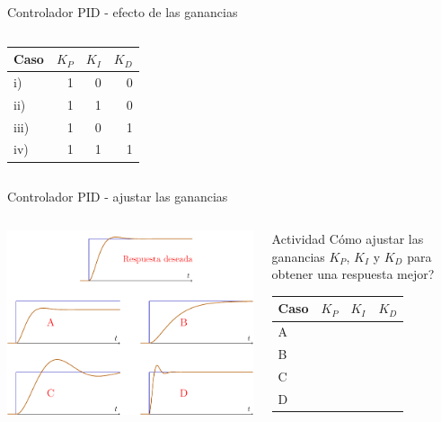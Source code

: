 \documentclass[presentation,aspectratio=169, usenames, dvipsnames]{beamer}
\begin{document}
\begin{frame}[label={sec:orgfd823fc}]{Controlador PID - efecto de las ganancias}
\begin{columns}
\begin{column}{0.3\columnwidth}
\begin{center}
\begin{tabular}{lrrr}
Caso & \textcolor{ppc}{\(K_P\)} & \textcolor{iic}{\(K_I\)} & \textcolor{ddc}{\(K_D\)}\\
\hline
i) & 1 & 0 & 0\\
ii) & 1 & 1 & 0\\
iii) & 1 & 0 & 1\\
iv) & 1 & 1 & 1\\
\end{tabular}
\end{center}
\end{column}
\end{columns}
\end{frame}


\begin{frame}[label={sec:org0264335}]{Controlador PID - ajustar las ganancias}
\begin{columns}
\begin{column}{0.6\columnwidth}
\begin{center}
\includegraphics[width=0.99\linewidth]{../figures/stepresponse-secondorder-exercise}
\end{center}
\end{column}

\begin{column}{0.4\columnwidth}
\alert{Actividad} Cómo ajustar las ganancias \(K_P\), \(K_I\) y \(K_D\) para obtener una respuesta mejor?

\begin{center}
\begin{tabular}{llll}
Caso & \textcolor{ppc}{\(K_P\)} & \textcolor{iic}{\(K_I\)} & \textcolor{ddc}{\(K_D\)}\\
\hline
A &  &  & \\
B &  &  & \\
C &  &  & \\
D &  &  & \\
\hline
\end{tabular}
\end{center}
\end{column}
\end{columns}
\end{frame}
\end{document}
